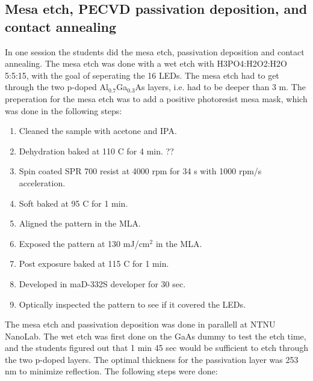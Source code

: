 \subsection{Mesa etch, PECVD passivation deposition, and contact annealing}
\label{methods:PECVD}
In one session the students did the mesa etch, passivation deposition and contact annealing.
The mesa etch was done with a wet etch with H3PO4:H2O2:H2O 5:5:15, with the goal of seperating the 16 LEDs.
The mesa etch had to get through the two p-doped Al$_0.7$Ga$_0.3$As layers, i.e. had to be deeper than 3 \textmu m.
The preperation for the mesa etch was to add a positive photoresist mesa mask, which was done in the following steps:

\begin{enumerate}
    \item Cleaned the sample with acetone and IPA.
    \item Dehydration baked at 110 \textdegree C for 4 min. ??
    \item Spin coated SPR 700 resist at 4000 rpm for 34 s with 1000 rpm/s acceleration.
    \item Soft baked at 95 \textdegree C for 1 min.
    \item Aligned the pattern in the MLA.
    \item Exposed the pattern at 130 mJ/cm$^2$ in the MLA.
    \item Post exposure baked at 115 \textdegree C for 1 min.
    \item Developed in maD-332S developer for 30 sec.
    \item Optically inspected the pattern to see if it covered the LEDs.
\end{enumerate}

The mesa etch and passivation deposition was done in parallell at NTNU NanoLab.
The wet etch was first done on the GaAs dummy to test the etch time, and the students figured out that 1 min 45 sec would be sufficient to etch through the two p-doped layers.
The optimal thickness for the passivation layer was 253 nm to minimize reflection.
The following steps were done:

